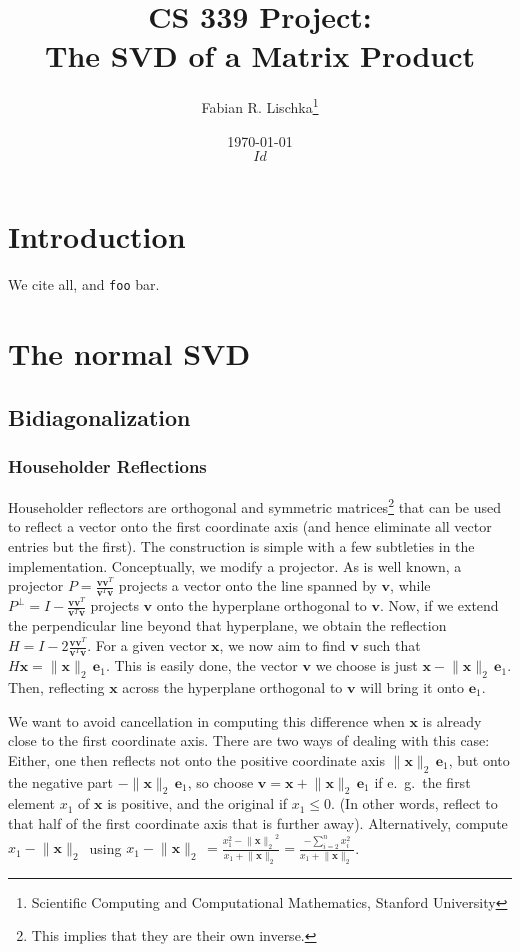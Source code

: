 \documentclass[11pt]{article}
\title{CS 339 Project:\\ The SVD of a Matrix Product}
\author{Fabian R. Lischka\thanks{Scientific Computing and Computational Mathematics, Stanford University}}
\date{\today\\\tiny{$Id$}}
\newcommand{\ve}[1]{\ensuremath{\mathbf{#1}}}
\newcommand{\tnorm}[1]{\ensuremath{\lVert{\ve{#1}}\rVert_2\,}}
\newcommand{\tnormns}[1]{\ensuremath{\lVert{\ve{#1}}\rVert_2}}
\newcommand{\sfrac}[2]{\ensuremath{{\scriptstyle\frac{\scriptstyle #1}{\scriptstyle #2}}}}
\begin{document}
\lstset{language=Matlab, basicstyle=\footnotesize, numbers=left, numberstyle=\tiny, stepnumber=5, frame=single, columns=flexible, captionpos = b}

\maketitle
\DeleteShortVerb{\$}
\tableofcontents
\lstlistoflistings


\section{Introduction}
We cite all, and \verb+foo+ bar. 
\section{The normal SVD}

\subsection{Bidiagonalization}

\subsubsection{Householder Reflections}
Householder reflectors are orthogonal and symmetric matrices\footnote{This implies that they are their own inverse.} that can be used to reflect a vector onto the first coordinate axis (and hence eliminate all vector entries but the first). The construction is simple with a few subtleties in the implementation. Conceptually, we modify a projector. As is well known, a projector $P =\sfrac{\ve v\ve v^T}{\ve v^T\ve v}$ projects a vector onto the line spanned by $\ve v$, while $P^\bot = I - \sfrac{\ve v\ve v^T}{\ve v^T\ve v}$ projects $\ve v$ onto the hyperplane orthogonal to $\ve v$. Now, if we extend the perpendicular line beyond that hyperplane, we obtain the reflection $H = I - 2\sfrac{\ve v\ve v^T}{\ve v^T\ve v}$. For a given vector $\ve x$, we now aim to find $\ve v$ such that $H\ve x=\tnorm x\ve e_1$. This is easily done, the vector \ve v we choose is just $\ve x -\tnorm x \ve e_1$. Then, reflecting \ve x across the hyperplane orthogonal to \ve v will bring it onto $\ve e_1$.

We want to avoid cancellation in computing this difference when \ve x is already close to the first coordinate axis. There are two ways of dealing with this case: Either, one then reflects not onto the positive coordinate axis $\tnorm x \ve e_1$, but onto the negative part $-\tnorm x \ve e_1$, so choose $\ve v = \ve x + \tnorm x \ve e_1$ if e.~g.\ the first element $x_1$ of \ve x is positive, and the original if $x_1\le 0$. (In other words, reflect to that half of the first coordinate axis that is further away).
Alternatively, compute $x_1 - \tnorm x$ using $x_1 - \tnorm x = \frac{x_1^2 - \tnormns x^2}{x_1 + \tnorm x}=\frac{-\sum_{i=2}^n x_i^2}{x_1 + \tnorm x}$.
\end{document}
